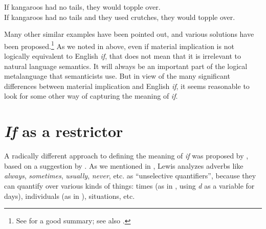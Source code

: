 \ea \label{ex:19.26}
\ea  If kangaroos had no tails, they would topple over.\\
\ex  If kangaroos had no tails and they used crutches, they would topple over.
     \z
\z


Many other similar examples have been pointed out, and various solutions have been proposed.\footnote{See  for a good summary; see also \textcites[83--87]{Gazdar1979}[ch2--3]{Bennett2003}.} As we noted in  above, even if material implication is not logically equivalent to English \textit{if}, that does not mean that it is irrelevant to natural language semantics. It will always be an important part of the logical metalanguage that semanticists use. But in view of the many significant differences between material implication and English \textit{if}, it seems reasonable to look for some other way of capturing the meaning of \textit{if}.


\section{\textit{If} as a restrictor}\label{sec:19.5}

A radically different approach to defining the meaning of \textit{if} was proposed by \citet{Kratzer1986}, based on a suggestion by \citet{Lewis1975}. As we mentioned in , Lewis analyzes adverbs like \textit{always}, \textit{sometimes}, \textit{usually}, \textit{never}, etc. as “unselective quantifiers”, because they can quantify over various kinds of things: times (as in , using \textit{d} as a variable for days), individuals (as in ), situations, etc.


